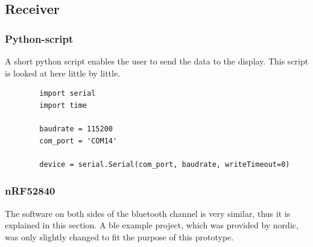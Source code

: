 \subsection{Receiver}

\subsubsection{Python-script}
\lstset{basicstyle=\footnotesize}
\lstset{style=mystyle}

A short python script enables the user to send the data to the display.
This script is looked at here little by little.

	\begin{lstlisting}
		import serial
		import time
		
		baudrate = 115200
		com_port = 'COM14'
		
		device = serial.Serial(com_port, baudrate, writeTimeout=0)
	\end{lstlisting}
	 


\subsubsection{nRF52840}
The software on both sides of the bluetooth channel is very similar, thus it is explained in this section.
A \acs{ble} example project, which was provided by nordic, was only slightly changed to fit the purpose of this prototype.

